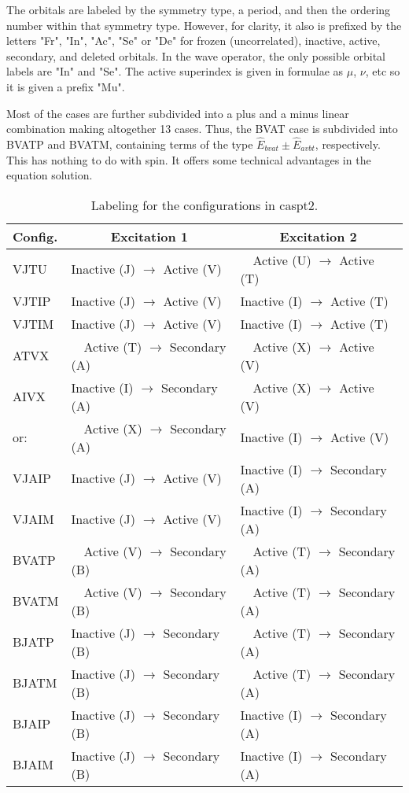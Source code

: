 The orbitals are labeled by the symmetry type, a period, and then the ordering number
within that symmetry type. However, for clarity, it also is prefixed by the letters
"Fr", "In", "Ac", "Se" or "De" for frozen (uncorrelated), inactive, active,
secondary, and deleted orbitals. In the wave operator, the only possible orbital
labels are "In" and "Se".
The active superindex is given in formulae as $\mu$, $\nu$, etc so it is 
given a prefix "Mu".

Most of the cases are further subdivided into a plus and a minus linear combination
making altogether 13 cases. Thus, the BVAT case is subdivided into BVATP and BVATM,
containing terms of the type $\hat{E}_{bvat} \pm \hat{E}_{avbt}$, respectively.
This has nothing to do with spin. It offers some technical advantages in the
equation solution.

\begin{center}
\begin{table}[ht]
\caption{\label{tab:pt2ex}Labeling for the configurations in caspt2.}
\begin{tabular}{lll}
\\
Config. & \multicolumn{1}{c}{Excitation 1} & \multicolumn{1}{c}{Excitation 2} \\
\hline
VJTU  & Inactive (J) $\to$  Active (V) & \ \ Active (U) $\to$   Active (T)   \\
VJTIP & Inactive (J) $\to$  Active (V) & Inactive (I) $\to$   Active (T)   \\
VJTIM & Inactive (J) $\to$  Active (V) & Inactive (I) $\to$   Active (T)   \\
ATVX  & \ \ Active (T) $\to$ Secondary (A) & \ \ Active (X) $\to$   Active (V)   \\
AIVX  & Inactive (I) $\to$ Secondary (A) & \ \ Active (X) $\to$  Active (V)   \\
 or:  & \ \ Active (X) $\to$ Secondary (A) & Inactive (I) $\to$  Active (V)   \\
VJAIP & Inactive (J) $\to$  Active (V) & Inactive (I) $\to$ Secondary (A)   \\ 
VJAIM & Inactive (J) $\to$  Active (V) & Inactive (I) $\to$ Secondary (A)   \\
BVATP & \ \ Active (V) $\to$ Secondary (B) & \ \ Active (T) $\to$ Secondary (A)   \\
BVATM & \ \ Active (V) $\to$ Secondary (B) & \ \ Active (T) $\to$ Secondary (A)   \\
BJATP & Inactive (J) $\to$ Secondary (B) & \ \ Active (T) $\to$ Secondary (A)   \\
BJATM & Inactive (J) $\to$ Secondary (B) & \ \ Active (T) $\to$ Secondary (A)   \\
BJAIP & Inactive (J) $\to$ Secondary (B) & Inactive (I) $\to$ Secondary (A)   \\
BJAIM & Inactive (J) $\to$ Secondary (B) & Inactive (I) $\to$ Secondary (A)  
\\\hline\hline
\end{tabular}
\end{table}
\end{center}

